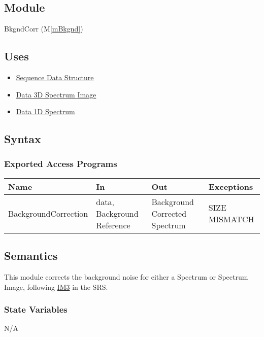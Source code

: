 \documentclass[12pt, titlepage]{article}
\newcommand{\mref}[1]{M\ref{#1}}
\begin{document}
\subsection{Module}
BkgndCorr (\mref{mBkgnd})

\subsection{Uses}
\begin{itemize}
    \item \hyperref[Mod:Seq]{Sequence Data Structure}
    \item \hyperref[Mod:SI]{Data 3D Spectrum Image}
    \item \hyperref[Mod:Spectrum]{Data 1D Spectrum}
\end{itemize}

\subsection{Syntax}

\subsubsection{Exported Access Programs}
\begin{center}
    \begin{tabular}{p{4cm} p{3.5cm} p{4cm} p{3cm}}
        \hline
        \textbf{Name} & \textbf{In} & \textbf{Out} & \textbf{Exceptions} \\
        \hline
        BackgroundCorrection & data, Background Reference & Background Corrected
        Spectrum & SIZE MISMATCH \\
        \hline
    \end{tabular}
\end{center}

\subsection{Semantics}
This module corrects the background noise for either a Spectrum or Spectrum
Image, following \hyperref[background]{IM3} in the SRS.

\subsubsection{State Variables}
N/A
\end{document}
